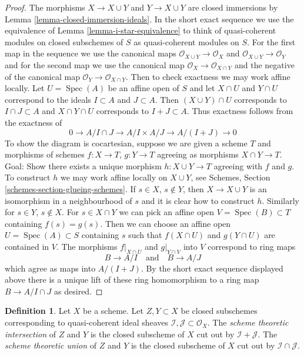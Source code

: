 \documentclass[10pt,a4paper]{amsart}
\theoremstyle{plain}
\theoremstyle{definition}
\newtheorem{definition}[subsection]{Definition}
\theoremstyle{remark}
\numberwithin{equation}{subsection}
\def\Spec{\mathop{\mathrm{Spec}}}
\begin{document}
\begin{proof}
The morphisms $X \to X \cup Y$ and $Y \to X \cup Y$ are closed immersions
by Lemma \ref{lemma-closed-immersion-ideals}. In the short exact sequence
we use the equivalence of Lemma \ref{lemma-i-star-equivalence} to think of
quasi-coherent modules on closed subschemes of $S$ as quasi-coherent modules
on $S$. For the first map in the sequence we use the canonical maps
$\mathcal{O}_{X \cup Y} \to \mathcal{O}_X$ and
$\mathcal{O}_{X \cup Y} \to \mathcal{O}_Y$
and for the second map we use the canonical map
$\mathcal{O}_X \to \mathcal{O}_{X \cap Y}$ and
the negative of the canonical map
$\mathcal{O}_Y \to \mathcal{O}_{X \cap Y}$. Then to check
exactness we may work affine locally.
Let $U = \Spec(A)$ be an affine open of $S$ and let $X \cap U$ and $Y \cap U$
correspond to the ideals $I \subset A$ and $J \subset A$. Then
$(X \cup Y) \cap U$ corresponds to $I \cap J \subset A$
and $X \cap Y \cap U$ corresponds to $I + J \subset A$.
Thus exactness follows from the exactness of
$$
0 \to A/I \cap J \to A/I \times A/J \to A/(I + J) \to 0
$$
To show the diagram is cocartesian, suppose we are given a scheme $T$
and morphisms of schemes $f : X \to T$, $g : Y \to T$ agreeing
as morphisms $X \cap Y \to T$. Goal: Show there exists a unique
morphism $h : X \cup Y \to T$ agreeing with $f$ and $g$.
To construct $h$ we may work affine locally on $X \cup Y$, see
Schemes, Section \ref{schemes-section-glueing-schemes}.
If $s \in X$, $s \not \in Y$, then $X \to X \cup Y$ is
an isomorphism in a neighbourhood of $s$ and it is clear
how to construct $h$. Similarly for $s \in Y$, $s \not \in X$.
For $s \in X \cap Y$ we can pick an affine open
$V = \Spec(B) \subset T$ containing $f(s) = g(s)$.
Then we can choose an affine open $U = \Spec(A) \subset S$
containing $s$ such that $f(X \cap U)$ and $g(Y \cap U)$
are contained in $V$. The morphisms $f|_{X \cap U}$
and $g|_{Y \cap V}$ into $V$ correspond to ring maps
$$
B \to A/I
\quad\text{and}\quad
B \to A/J
$$
which agree as maps into $A/(I + J)$. By the short exact sequence
displayed above there is a unique lift of these ring homomorphism
to a ring map $B \to A/I \cap J$ as desired.
\end{proof}

\begin{definition}
\label{definition-scheme-theoretic-intersection-union}
Let $X$ be a scheme. Let $Z, Y \subset X$ be closed subschemes
corresponding to quasi-coherent ideal sheaves
$\mathcal{I}, \mathcal{J} \subset \mathcal{O}_X$.
The {\it scheme theoretic intersection} of $Z$ and $Y$
is the closed subscheme of $X$ cut out by $\mathcal{I} + \mathcal{J}$.
The {\it scheme theoretic union} of $Z$ and $Y$
is the closed subscheme of $X$ cut out by
$\mathcal{I} \cap \mathcal{J}$.
\end{definition}
\end{document}
